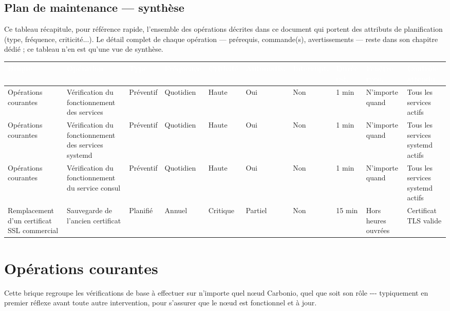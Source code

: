\documentclass[11pt,a4paper]{report}
\newcommand{\tblhead}[1]{\textcolor{white}{\textbf{#1}}}
\begin{document}
\begin{landscape}
\chapter{Plan de maintenance --- synthèse}
Ce tableau récapitule, pour référence rapide, l'ensemble des opérations décrites dans ce document qui portent des attributs de planification (type, fréquence, criticité...). Le détail complet de chaque opération --- prérequis, commande(s), avertissements --- reste dans son chapitre dédié ; ce tableau n'en est qu'une vue de synthèse.

\footnotesize
\begin{longtable}{|p{1.8cm}|p{2.6cm}|p{1.3cm}|p{1.3cm}|p{1.2cm}|p{1.3cm}|p{1.3cm}|p{1.1cm}|p{1.6cm}|p{2.5cm}|}
\hline
\rowcolor{primary}\tblhead{Brique} & \tblhead{Opération} & \tblhead{Type} & \tblhead{Fréquence} & \tblhead{Criticité} & \tblhead{Automatis.} & \tblhead{Interrupt.} & \tblhead{Durée est.} & \tblhead{Fenêtre reco.} & \tblhead{Contrôle attendu} \\
\hline
\endhead
Opérations courantes & Vérification du fonctionnement des services & Préventif & Quotidien & Haute & Oui & Non & 1 min & N'importe quand & Tous les services actifs \\
\hline
Opérations courantes & Vérification du fonctionnement des services systemd & Préventif & Quotidien & Haute & Oui & Non & 1 min & N'importe quand & Tous les services systemd actifs \\
\hline
Opérations courantes & Vérification du fonctionnement du service consul & Préventif & Quotidien & Haute & Oui & Non & 1 min & N'importe quand & Tous les services systemd actifs \\
\hline
Remplacement d'un certificat SSL commercial & Sauvegarde de l'ancien certificat & Planifié & Annuel & Critique & Partiel & Non & 15 min & Hors heures ouvrées & Certificat TLS valide \\
\hline
\end{longtable}
\normalsize
\end{landscape}

\chapter{Opérations courantes}

Cette brique regroupe les vérifications de base à effectuer sur
n'importe quel nœud Carbonio, quel que soit son rôle -\allowbreak{}-\allowbreak{}-\allowbreak{} typiquement en
premier réflexe avant toute autre intervention, pour s'assurer que le
nœud est fonctionnel et à jour.\allowbreak{}
\end{document}
